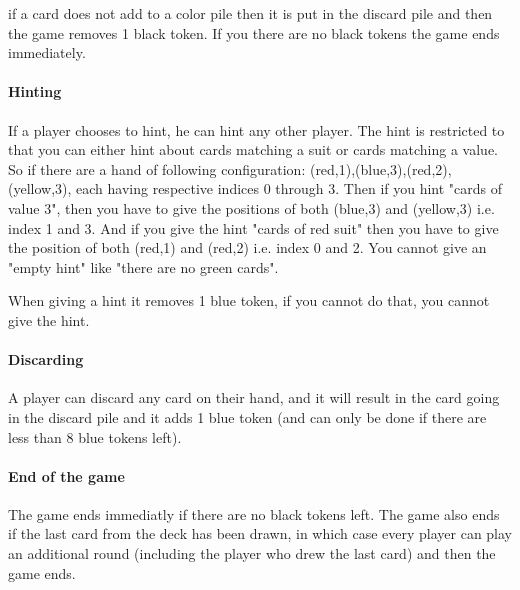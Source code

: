 if a card does not add to a color pile then it is put in the discard pile and then the game removes 1 black token. 
If you there are no black tokens the game ends immediately.  

\paragraph{Hinting}
If a player chooses to hint, he can hint any other player. The hint is restricted to that you can either hint about cards matching a suit or cards matching a value. 
So if there are a hand of following configuration: (red,1),(blue,3),(red,2),(yellow,3), each having respective indices 0 through 3. 
Then if you hint "cards of value 3", then you have to give the positions of both (blue,3) and (yellow,3) i.e. index 1 and 3. 
And if you give the hint "cards of red suit" then you have to give the position of both (red,1) and (red,2) i.e. index 0 and 2. 
You cannot give an "empty hint" like "there are no green cards".

When giving a hint it removes 1 blue token, if you cannot do that, you cannot give the hint.

\paragraph{Discarding}
A player can discard any card on their hand, and it will result in the card going in the discard pile and it adds 1 blue token (and can only be done if there are less than 8 blue tokens left).

\paragraph{End of the game}
The game ends immediatly if there are no black tokens left. The game also ends if the last card from the deck has been drawn, in which case every player can play an additional round (including the player who drew the last card) and then the game ends.




